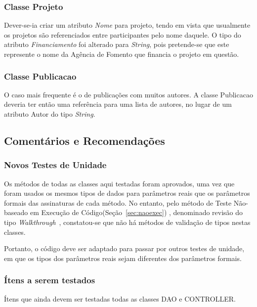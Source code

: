 \documentclass[11pt, a4paper]{book}
\begin{document}
\subsubsection{Classe Projeto}

Dever-se-ia criar um atributo \emph{Nome} para projeto, tendo em vista que usualmente os projetos são referenciados entre participantes pelo nome daquele.
O tipo do atributo \emph{Financiamento} foi alterado para \emph{String}, pois pretende-se que este represente o nome da Agência de Fomento que financia o projeto em questão.

\subsubsection{Classe Publicacao}

O caso mais frequente é o de publicações com muitos autores. A classe Publicacao deveria ter então uma referência para uma lista de autores, no lugar de um atributo Autor do tipo \emph{String}.

\subsection{Comentários e Recomendações}

\subsubsection{Novos Testes de Unidade}
Os métodos de todas as classes aqui testadas foram aprovados, uma vez que foram usados os mesmos tipos de dados para parâmetros reais que os parâmetros formais das assinaturas de cada método. No entanto, pelo método de Teste Não-baseado em Execução de Código(Seção~\ref{sec:naoexec}) , denominado revisão do tipo \emph{Walkthrough}~\citep{schach2007}, constatou-se que não há métodos de validação de tipos nestas classes. 


Portanto, o código deve ser adaptado para passar por outros testes de unidade, em que os tipos dos parâmetros reais sejam diferentes dos parâmetros formais.

\subsubsection{Ítens a serem testados}

Ítens que ainda devem ser testadas todas as classes DAO e CONTROLLER.

\backmatter \singlespacing   


\end{document}
